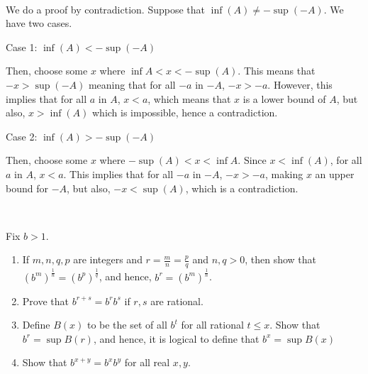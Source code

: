 \documentclass{article}
\begin{document}
\begin{solution}
\

We do a proof by contradiction. Suppose that $\inf(A) \neq -\sup(-A)$. We have two cases. 

Case 1: $\inf(A) < -\sup(-A)$

Then, choose some $x$ where $\inf{A} < x < -\sup(A)$. This means that $-x > \sup(-A)$ meaning that for all $-a$ in $-A$, $-x > -a$. However, this implies that for all $a$ in $A$, $x < a$, which means that $x$ is a lower bound of $A$, but also, $x > \inf(A)$ which is impossible, hence a contradiction.   

Case 2: $\inf(A) > -\sup(-A)$


Then, choose some $x$ where $ -\sup(A) < x < \inf{A}$. Since $x < \inf(A)$, for all $a$ in $A$, $x < a$. This implies that for all $-a$ in $-A$, $-x > -a$, making $x$ an upper bound for $-A$, but also, $-x < \sup(A)$, which is a contradiction.
\end{solution}

\begin{exercise}[6]
\

Fix $b > 1$. 

\begin{enumerate}
    \item If $m,n,q,p$ are integers and $r = \frac{m}{n} = \frac{p}{q}$ and $n, q > 0$, then show that $(b^m)^\frac{1}{n} = (b^p)^\frac{1}{q}$, and hence, $b^r = (b^m)^{\frac{1}{n}}$.
    \item Prove that $b^{r+s} = b^rb^s$ if $r,s$ are rational.
    \item Define $B(x)$ to be the set of all $b^t$ for all rational $t \leq x$. Show that $b^r = \sup B(r)$, and hence, it is logical to define that $b^x = \sup B(x)$
    \item Show that $b^{x+y} = b^xb^y$ for all real $x,y$.
\end{enumerate}
\end{exercise}
\end{document}
